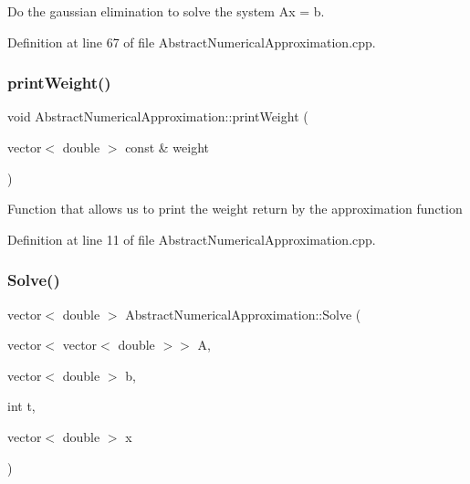 Do the gaussian elimination to solve the system Ax = b. 



Definition at line 67 of file Abstract\+Numerical\+Approximation.\+cpp.

\mbox{\label{class_abstract_numerical_approximation_a841c83a7ae9f2146001581f3a7f8444a}} 
\subsubsection{\texorpdfstring{print\+Weight()}{printWeight()}}
{\footnotesize\ttfamily void Abstract\+Numerical\+Approximation\+::print\+Weight (\begin{DoxyParamCaption}\item[{vector$<$ double $>$ const \&}]{weight }\end{DoxyParamCaption})}



Function that allows us to print the weight return by the approximation function 



Definition at line 11 of file Abstract\+Numerical\+Approximation.\+cpp.

\mbox{\label{class_abstract_numerical_approximation_abccba1cb27301df86f2adbfa5e6525a5}} 
\subsubsection{\texorpdfstring{Solve()}{Solve()}}
{\footnotesize\ttfamily vector$<$ double $>$ Abstract\+Numerical\+Approximation\+::\+Solve (\begin{DoxyParamCaption}\item[{vector$<$ vector$<$ double $>$$>$}]{A,  }\item[{vector$<$ double $>$}]{b,  }\item[{int}]{t,  }\item[{vector$<$ double $>$}]{x }\end{DoxyParamCaption})}



